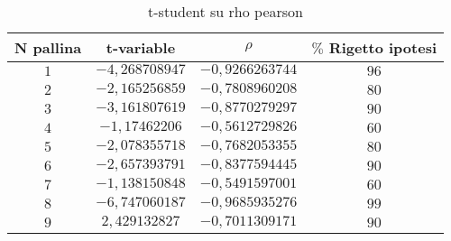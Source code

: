 \documentclass[a4paper,11pt,oneside]{article}
\begin{document}
\begin{table}[h!]
\caption{t-student su rho pearson}
\label{tab:t_student}
\centering
\begin{tabular}{|c|c|c|c|}
\hline
 \textbf{N pallina} & \textbf{}t-variable & \textbf{$\rho$} & \textbf{{$\%$ Rigetto ipotesi}} \\ \hline
\rowcolor[rgb]{0.85,0.85,0.85}$1$ & $-4,268708947$ & $-0,9266263744$ & $96$ \\ \hline
 $2$ & $-2,165256859$ & $-0,7808960208$ & $80$ \\ \hline
\rowcolor[rgb]{0.85,0.85,0.85}$3$ & $-3,161807619$ & $-0,8770279297$ & $90$ \\ \hline
 $4$ & $-1,17462206$ & $-0,5612729826$ & $60$ \\ \hline
\rowcolor[rgb]{0.85,0.85,0.85}$5$ & $-2,078355718$ & $-0,7682053355$ & $80$ \\ \hline
 $6$ & $-2,657393791$ & $-0,8377594445$ & $90$ \\ \hline
\rowcolor[rgb]{0.85,0.85,0.85}$7$ & $-1,138150848$ & $-0,5491597001$ & $60$ \\ \hline
 $8$ & $-6,747060187$ & $-0,9685935276$ & $99$ \\ \hline
\rowcolor[rgb]{0.85,0.85,0.85}$9$ & $2,429132827$ & $-0,7011309171$ & $90$ \\ \hline
\end{tabular}
\end{table}


\newpage%
\end{document}
